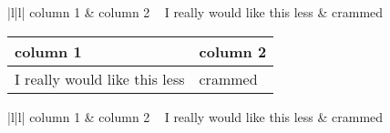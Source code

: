 \documentclass{article}
\begin{document}
{\renewcommand{\arraystretch}{2}%
\begin{tabular}{|l|l|}
	\hline
	column 1                      & column 2 \      \hline
	I really would like this less & crammed \      \hline
\end{tabular}} \quad
\begin{tabular}{|l|l|}
	\hline
	column 1                      & column 2 \\[4ex]
	\hline
	I really would like this less & crammed  \\[5pt]
	\hline
\end{tabular} \quad
{\setlength{\extrarowheight}{20pt}%
	\begin{tabular}{|l|l|}
		\hline
		column 1                      & column 2 \      \hline
		I really would like this less & crammed \      \hline
	\end{tabular}}
\end{document}
